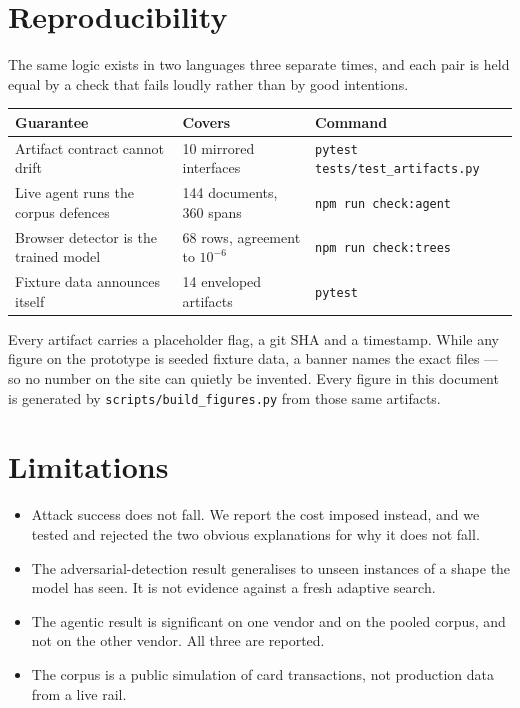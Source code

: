 \documentclass[11pt,a4paper]{article}
\begin{document}
\section{Reproducibility}
\label{sec:repro}

The same logic exists in two languages three separate times, and each pair is held equal by
a check that fails loudly rather than by good intentions.

\begin{center}
\begin{tabular}{@{}lll@{}}
\toprule
\textbf{Guarantee} & \textbf{Covers} & \textbf{Command} \\
\midrule
Artifact contract cannot drift & 10 mirrored interfaces & \texttt{pytest tests/test\_artifacts.py} \\
Live agent runs the corpus defences & 144 documents, 360 spans & \texttt{npm run check:agent} \\
Browser detector is the trained model & 68 rows, agreement to $10^{-6}$ & \texttt{npm run check:trees} \\
Fixture data announces itself & 14 enveloped artifacts & \texttt{pytest} \\
\bottomrule
\end{tabular}
\end{center}

\noindent
Every artifact carries a placeholder flag, a git SHA and a timestamp. While any figure on
the prototype is seeded fixture data, a banner names the exact files --- so no number on the
site can quietly be invented. Every figure in this document is generated by
\texttt{scripts/build\_figures.py} from those same artifacts.

\section{Limitations}

\begin{itemize}
  \item Attack success does not fall. We report the cost imposed instead, and we tested and
        rejected the two obvious explanations for why it does not fall.
  \item The adversarial-detection result generalises to unseen instances of a shape the model
        has seen. It is not evidence against a fresh adaptive search.
  \item The agentic result is significant on one vendor and on the pooled corpus, and not on
        the other vendor. All three are reported.
  \item The corpus is a public simulation of card transactions, not production data from a
        live rail.
\end{itemize}
\end{document}
